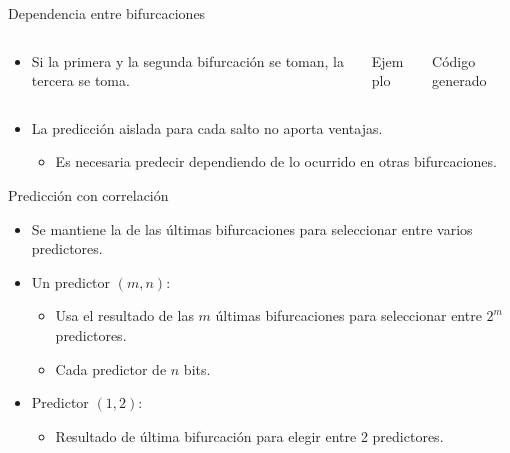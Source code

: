 \begin{frame}[t]{Dependencia entre bifurcaciones}

\begin{columns}[T]

\begin{column}{.4\textwidth}
\begin{itemize}
  \item Si la primera y la segunda bifurcación se toman, la tercera 
         se toma.
\end{itemize}
\end{column}

\begin{column}{.3\textwidth}
\begin{block}{Ejemplo}

\end{block}
\end{column}

\pause
\begin{column}{.3\textwidth}
\begin{block}{Código generado}
\end{block}
\end{column}
\end{columns}

\begin{itemize}
  \item La predicción aislada para cada salto no aporta ventajas.
    \begin{itemize}
      \item Es necesaria predecir dependiendo de lo ocurrido en otras bifurcaciones.
    \end{itemize}
\end{itemize}

\end{frame}


\begin{frame}[t]{Predicción con correlación}
\begin{itemize}
  \item Se mantiene la  de las últimas bifurcaciones 
        para seleccionar entre varios predictores.

  \item Un predictor $(m,n)$:
    \begin{itemize}
      \item Usa el resultado de las $m$ últimas bifurcaciones para seleccionar 
            entre $2^m$ predictores.
      \item Cada predictor de $n$ bits.
    \end{itemize}

  \item Predictor $(1,2)$:
    \begin{itemize}
      \item Resultado de última bifurcación para elegir entre 2 predictores.
    \end{itemize}
\end{itemize}
\end{frame}

